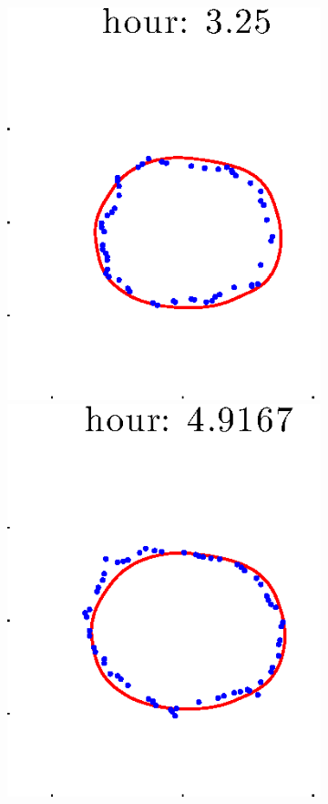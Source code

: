 \documentclass[12pt]{article}
\begin{document}
\begin{figure}[h!]
\begin{subfigure}[b]{.3\textwidth}
		\includegraphics[height=.15\textheight]{Pos10exp2/full/full3.eps}
		\includegraphics[height=.15\textheight]{Pos10exp2/full/full4.eps}

\end{subfigure}
\end{figure}
\end{document}
